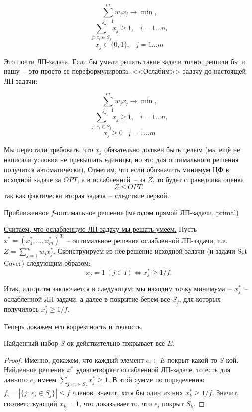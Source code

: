 $$\sum_{j=1}^m w_j x_j \rightarrow \min,$$
$$\sum_{j:\, e_i \in S_j} x_j \geq 1, \;\;\; i=1\ldots n,$$
$$x_j \in \{0, 1\}, \;\;\; j=1\ldots m$$

Это \underline{почти} ЛП-задача. Если бы умели решать такие задачи точно, решили бы и нашу~-- это просто ее переформулировка. <<Ослабим>> задачу до настоящей ЛП-задачи:

$$\sum_{j=1}^m w_j x_j \rightarrow \min,$$
$$\sum_{j:\, e_i \in S_j} x_j \geq 1, \;\;\; i=1\ldots n,$$
$$x_j \geq 0 \;\;\; j=1\ldots m$$

Мы перестали требовать, что $x_j$ обязательно должен быть целым (мы ещё не написали условия не превышать единицы, но это для оптимального решения получится автоматически). Отметим, что если обозначить минимум ЦФ в исходной задаче за $OPT$, а в ослабленной~-- за $Z$, то будет справедлива оценка $$Z \leq OPT,$$ так как фактически вторая задача~-- следствие первой.

\begin{algodescription}{Приближенное $f$-оптимальное решение (методом прямой ЛП-задачи, primal)}

\underline{Считаем, что ослабленную ЛП-задачу мы решать умеем.} Пусть $x^* = (x_1^*, \ldots, x_m^*)^T$~-- оптимальное решение ослабленной ЛП-задачи, т.е. $Z = \sum\limits_{j=1}^m w_j x_j^*$. Сконструируем из нее решение исходной задачи (и задачи Set Cover) следующим образом:
$$x_j = 1\, (j \in I) \iff x_j^* \geq 1/f;$$

Итак, алгоритм заключается в следующем: мы находим точку минимума~-- $x_j^*$~-- ослабленной ЛП-задачи, а далее в покрытие берем все $S_j$, для которых получилось $x_j^* \geq 1/f$.
\end{algodescription}

Теперь докажем его корректность и точность.

\begin{theorem*}
    Найденный набор $S$-ок действительно покрывает всё $E$.
\end{theorem*}
\begin{proof}
    Именно, докажем, что каждый элемент $e_i \in E$ покрыт какой-то $S$-кой. Найденное решение $x^*$ удовлетворяет ослабленной ЛП-задаче, то есть для данного $e_i$ имеем $\sum\limits_{j: \, e_i \in S_j} x_j^* \geq 1$. В этой сумме по определению $f_i = \left|\{j: \, e_i \in S_j\}\right| \leq f$ членов, значит, хотя бы один из них $x_k^*\geq 1/f$. Значит, соответствующий $x_k = 1$, что доказывает то, что $e_i$ покрыт $S_k$.
\end{proof}

